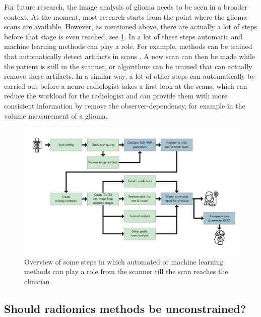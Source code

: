 For future research, the image analysis of glioma needs to be seen in a broader context.
At the moment, most research starts from the point where the glioma scans are available.
However, as mentioned above, there are actually a lot of steps before that stage is even reached, see \cref{fig:discussion_pipeline_automatic}.
In a lot of these steps automatic and machine learning methods can play a role.
For example, methods can be trained that automatically detect artifacts in scans \autocite{kustner2018artifacts}.
A new scan can then be made while the patient is still in the scanner, or algorithms can be trained that can actually remove these artifacts.
In a similar way, a lot of other steps can automatically be carried out before a neuro-radiologist takes a first look at the scans, which can reduce the workload for the radiologist and can provide them with more consistent information by remove the observer-dependency, for example in the volume measurement of a \gls{glioma}.


\begin{figure}[htbp]
\includegraphics[width=\textwidth]{Figures/Pipeline.png}
\caption{Overview of some steps in which automated or machine learning methods can play a role from the scanner till the scan reaches the clinician}\label{fig:discussion_pipeline_automatic}
\end{figure}


\subsection{Should radiomics methods be unconstrained?}

